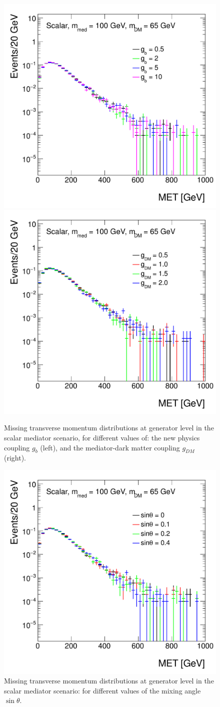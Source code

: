\begin{figure}[hbpt!]
	\begin{center}
		\includegraphics[width=0.49\linewidth]{figures/EW/monoH/s_gb_65_100_04_MET_et_Log}
		\includegraphics[width=0.49\linewidth]{figures/EW/monoH/s_gdm_MET_et_Log}
		\caption{Missing transverse momentum distributions at generator level in the scalar 
			mediator scenario, for different values of: the new physics coupling $g_b$ (left),
			and the mediator-dark matter coupling $g_{DM}$ (right).
			\label{fig:metScalarCoupling}}
	\end{center}
\end{figure}

\begin{figure}[hbpt!]
	\begin{center}
		\includegraphics[width=0.49\linewidth]{figures/EW/monoH/s_theta_65_100_2_MET_et_Log}
		\caption{Missing transverse momentum distributions at generator level in the scalar 
			mediator scenario: for different values of the mixing angle $\sin\theta$.
			\label{fig:metScalarCoupling2} }
	\end{center}
\end{figure}

